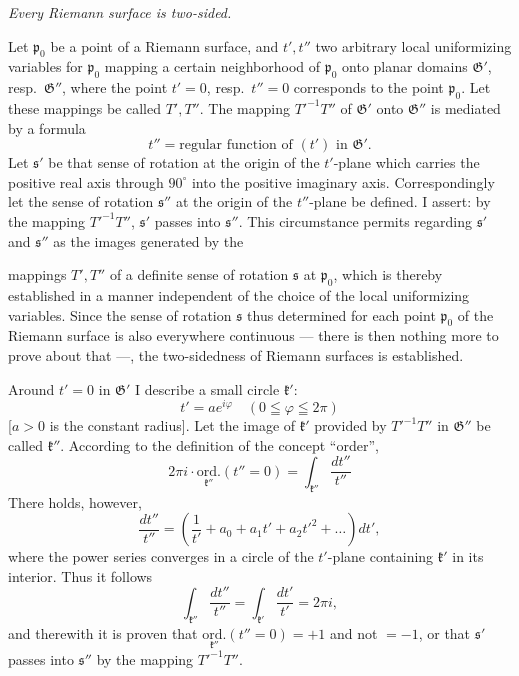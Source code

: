 \documentclass{article}
\begin{document}
\emph{Every Riemann surface is two-sided.}

Let $\mathfrak{p}_0$ be a point of a Riemann surface, and $t', t''$ two arbitrary local uniformizing variables for $\mathfrak{p}_0$ mapping a certain neighborhood of $\mathfrak{p}_0$ onto planar domains $\mathfrak{G}'$, resp.\ $\mathfrak{G}''$, where the point $t' = 0$, resp.\ $t'' = 0$ corresponds to the point $\mathfrak{p}_0$. Let these mappings be called $T', T''$. The mapping $T'^{-1} T''$ of $\mathfrak{G}'$ onto $\mathfrak{G}''$ is mediated by a formula
\[ t'' = \text{regular function of } (t') \text{ in } \mathfrak{G}'. \]
Let $\mathfrak{s}'$ be that sense of rotation at the origin of the $t'$-plane which carries the positive real axis through $90^\circ$ into the positive imaginary axis. Correspondingly let the sense of rotation $\mathfrak{s}''$ at the origin of the $t''$-plane be defined. I assert: by the mapping $T'^{-1} T''$, $\mathfrak{s}'$ passes into $\mathfrak{s}''$. This circumstance permits regarding $\mathfrak{s}'$ and $\mathfrak{s}''$ as the images generated by the

mappings $T', T''$ of a definite sense of rotation $\mathfrak{s}$ at $\mathfrak{p}_0$, which is thereby established in a manner independent of the choice of the local uniformizing variables. Since the sense of rotation $\mathfrak{s}$ thus determined for each point $\mathfrak{p}_0$ of the Riemann surface is also everywhere continuous --- there is then nothing more to prove about that ---, the two-sidedness of Riemann surfaces is established.

Around $t' = 0$ in $\mathfrak{G}'$ I describe a small circle $\mathfrak{k}'$:
\[ t' = a e^{i\varphi} \quad (0 \leqq \varphi \leqq 2\pi) \]
[$a > 0$ is the constant radius]. Let the image of $\mathfrak{k}'$ provided by $T'^{-1} T''$ in $\mathfrak{G}''$ be called $\mathfrak{k}''$. According to the definition of the concept ``order'',
\[ 2\pi i \cdot \underset{\mathfrak{k}''}{\text{ord.}} (t'' = 0) = \int_{\mathfrak{k}''} \frac{dt''}{t''} \]
There holds, however,
\[ \frac{dt''}{t''} = \left(\frac{1}{t'} + a_0 + a_1 t' + a_2 t'^2 + \dots \right) dt', \]
where the power series converges in a circle of the $t'$-plane containing $\mathfrak{k}'$ in its interior. Thus it follows
\[ \int_{\mathfrak{k}''} \frac{dt''}{t''} = \int_{\mathfrak{k}'} \frac{dt'}{t'} = 2\pi i, \]
and therewith it is proven that $\underset{\mathfrak{k}''}{\text{ord.}} (t'' = 0) = + 1$ and not $= - 1$, or that $\mathfrak{s}'$ passes into $\mathfrak{s}''$ by the mapping $T'^{-1} T''$.
\end{document}

